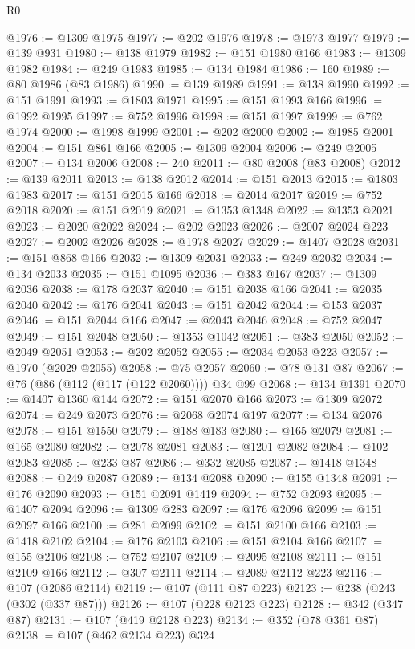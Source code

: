 \begin{lexlean}{R0}
\begin{coremodule}
@1976 := @1309 @1975
@1977 := @202 @1976
@1978 := @1973 @1977
@1979 := @139 @931
@1980 := @138 @1979
@1982 := @151 @1980 @166
@1983 := @1309 @1982
@1984 := @249 @1983
@1985 := @134 @1984
@1986 := 160
@1989 := @80 @1986 (@83 @1986)
@1990 := @139 @1989
@1991 := @138 @1990
@1992 := @151 @1991
@1993 := @1803 @1971
@1995 := @151 @1993 @166
@1996 := @1992 @1995
@1997 := @752 @1996
@1998 := @151 @1997
@1999 := @762 @1974
@2000 := @1998 @1999
@2001 := @202 @2000
@2002 := @1985 @2001
@2004 := @151 @861 @166
@2005 := @1309 @2004
@2006 := @249 @2005
@2007 := @134 @2006
@2008 := 240
@2011 := @80 @2008 (@83 @2008)
@2012 := @139 @2011
@2013 := @138 @2012
@2014 := @151 @2013
@2015 := @1803 @1983
@2017 := @151 @2015 @166
@2018 := @2014 @2017
@2019 := @752 @2018
@2020 := @151 @2019
@2021 := @1353 @1348
@2022 := @1353 @2021
@2023 := @2020 @2022
@2024 := @202 @2023
@2026 := @2007 @2024 @223
@2027 := @2002 @2026
@2028 := @1978 @2027
@2029 := @1407 @2028
@2031 := @151 @868 @166
@2032 := @1309 @2031
@2033 := @249 @2032
@2034 := @134 @2033
@2035 := @151 @1095
@2036 := @383 @167
@2037 := @1309 @2036
@2038 := @178 @2037
@2040 := @151 @2038 @166
@2041 := @2035 @2040
@2042 := @176 @2041
@2043 := @151 @2042
@2044 := @153 @2037
@2046 := @151 @2044 @166
@2047 := @2043 @2046
@2048 := @752 @2047
@2049 := @151 @2048
@2050 := @1353 @1042
@2051 := @383 @2050
@2052 := @2049 @2051
@2053 := @202 @2052
@2055 := @2034 @2053 @223
@2057 := @1970 (@2029 @2055)
@2058 := @75 @2057
@2060 := @78 @131 @87
@2067 := @76 (@86 (@112 (@117 (@122 @2060)))) @34 @99
@2068 := @134 @1391
@2070 := @1407 @1360 @144
@2072 := @151 @2070 @166
@2073 := @1309 @2072
@2074 := @249 @2073
@2076 := @2068 @2074 @197
@2077 := @134 @2076
@2078 := @151 @1550
@2079 := @188 @183
@2080 := @165 @2079
@2081 := @165 @2080
@2082 := @2078 @2081
@2083 := @1201 @2082
@2084 := @102 @2083
@2085 := @233 @87
@2086 := @332 @2085
@2087 := @1418 @1348
@2088 := @249 @2087
@2089 := @134 @2088
@2090 := @155 @1348
@2091 := @176 @2090
@2093 := @151 @2091 @1419
@2094 := @752 @2093
@2095 := @1407 @2094
@2096 := @1309 @283
@2097 := @176 @2096
@2099 := @151 @2097 @166
@2100 := @281 @2099
@2102 := @151 @2100 @166
@2103 := @1418 @2102
@2104 := @176 @2103
@2106 := @151 @2104 @166
@2107 := @155 @2106
@2108 := @752 @2107
@2109 := @2095 @2108
@2111 := @151 @2109 @166
@2112 := @307 @2111
@2114 := @2089 @2112 @223
@2116 := @107 (@2086 @2114)
@2119 := @107 (@111 @87 @223)
@2123 := @238 (@243 (@302 (@337 @87)))
@2126 := @107 (@228 @2123 @223)
@2128 := @342 (@347 @87)
@2131 := @107 (@419 @2128 @223)
@2134 := @352 (@78 @361 @87)
@2138 := @107 (@462 @2134 @223) @324

\end{coremodule}
\end{lexlean}
